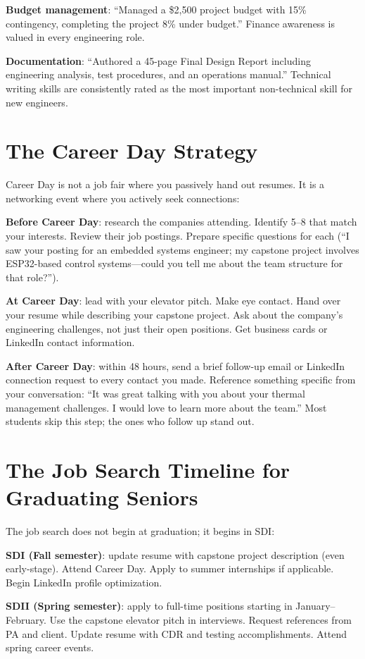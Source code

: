 \textbf{Budget management}: ``Managed a \$2,500 project budget with 15\% contingency, completing the project 8\% under budget.'' Finance awareness is valued in every engineering role.

\textbf{Documentation}: ``Authored a 45-page Final Design Report including engineering analysis, test procedures, and an operations manual.'' Technical writing skills are consistently rated as the most important non-technical skill for new engineers.

\section{The Career Day Strategy}
Career Day is not a job fair where you passively hand out resumes. It is a networking event where you actively seek connections:

\textbf{Before Career Day}: research the companies attending. Identify 5--8 that match your interests. Review their job postings. Prepare specific questions for each (``I saw your posting for an embedded systems engineer; my capstone project involves ESP32-based control systems---could you tell me about the team structure for that role?'').

\textbf{At Career Day}: lead with your elevator pitch. Make eye contact. Hand over your resume while describing your capstone project. Ask about the company's engineering challenges, not just their open positions. Get business cards or LinkedIn contact information.

\textbf{After Career Day}: within 48 hours, send a brief follow-up email or LinkedIn connection request to every contact you made. Reference something specific from your conversation: ``It was great talking with you about your thermal management challenges. I would love to learn more about the team.'' Most students skip this step; the ones who follow up stand out.



\section{The Job Search Timeline for Graduating Seniors}
The job search does not begin at graduation; it begins in SDI:

\textbf{SDI (Fall semester)}: update resume with capstone project description (even early-stage). Attend Career Day. Apply to summer internships if applicable. Begin LinkedIn profile optimization.

\textbf{SDII (Spring semester)}: apply to full-time positions starting in January--February. Use the capstone elevator pitch in interviews. Request references from PA and client. Update resume with CDR and testing accomplishments. Attend spring career events.

